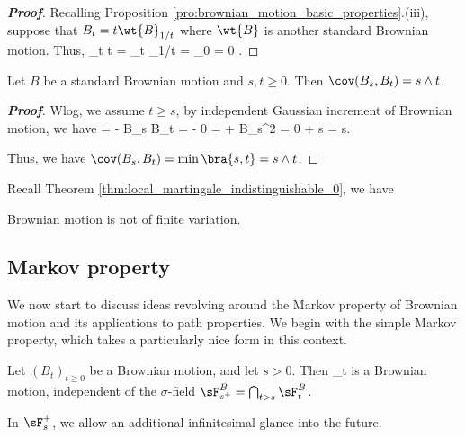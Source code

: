 \begin{proof}[\bf Proof]
Recalling Proposition \ref{pro:brownian_motion_basic_properties}.(iii), suppose that $B_t = t\wt{B}_{1/t}$ where $\wt{B}$ is another standard Brownian motion. Thus,
\be
\lim_{t\to\infty} t = \lim_{t\to \infty} _{1/t} = _0 = 0 .
\ee
\end{proof}

\begin{lemma}\label{lem:standard_brownian_motion_covariance}
Let $B$ be a standard Brownian motion and $s, t \geq 0$. Then $\cov(B_s,B_t) = s \land t$.
\end{lemma}

\begin{proof}[\bf Proof]
Wlog, we assume $t\geq s$, by independent Gaussian increment of Brownian motion, we have
\be
\cov {} = \E{} - \E B_s \E B_t = \E{} - 0 = \E{} + \E\bb B_s^2 = 0 + s = s.
\ee

Thus, we have $\cov(B_s,B_t) = \min\bra{s,t} = s \land t$.
\end{proof}

Recall Theorem \ref{thm:local_martingale_indistinguishable_0}, we have
\begin{proposition}\label{pro:brownian_motion_no_finite_variation}
Brownian motion is not of finite variation.
\end{proposition}




\subsection{Markov property}

We now start to discuss ideas revolving around the Markov property of Brownian motion and its applications to path properties. We begin with the simple Markov property, which takes a particularly nice form in this context.


\begin{theorem}\label{thm:simple_markov_property_brownian_motion}
Let $(B_t)_{t \geq 0}$ be a Brownian motion, and let $s > 0$. Then
\be
{}_{t }
\ee
is a Brownian motion, independent of the $\sigma$-field $\sF^B_{s^+} = \bigcap_{t>s} \sF^B_t$.
\end{theorem}

\begin{remark}
In $\sF_s^+$, we allow an additional infinitesimal glance into the future.
\end{remark}


